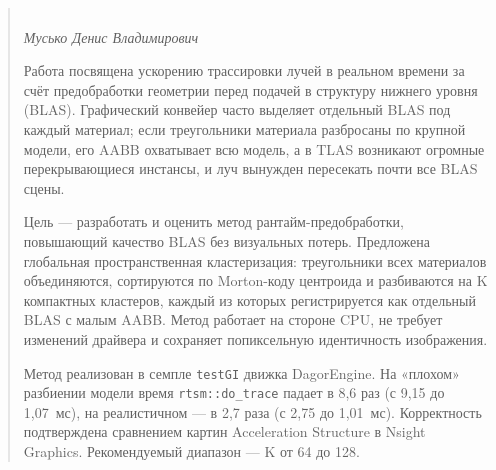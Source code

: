 \begin{abstract}

    \begin{center}
        \large{} \\
    \large\textit{Мусько Денис Владимирович} \\[1 cm]
    \end{center}

    Работа посвящена ускорению трассировки лучей в реальном времени за счёт
    предобработки геометрии перед подачей в структуру нижнего уровня (BLAS).
    Графический конвейер часто выделяет отдельный BLAS под каждый материал;
    если треугольники материала разбросаны по крупной модели, его AABB
    охватывает всю модель, а в TLAS возникают огромные перекрывающиеся
    инстансы, и луч вынужден пересекать почти все BLAS сцены.

    Цель --- разработать и оценить метод рантайм-предобработки, повышающий
    качество BLAS без визуальных потерь. Предложена глобальная
    пространственная кластеризация: треугольники всех материалов объединяются,
    сортируются по Morton-коду центроида и разбиваются на K компактных
    кластеров, каждый из которых регистрируется как отдельный BLAS с малым
    AABB. Метод работает на стороне CPU, не требует изменений драйвера и
    сохраняет попиксельную идентичность изображения.

    Метод реализован в семпле \texttt{testGI} движка DagorEngine. На «плохом»
    разбиении модели время \texttt{rtsm::do\_trace} падает в 8,6 раз
    (с 9,15 до 1,07~мс), на реалистичном --- в 2,7 раза
    (с 2,75 до 1,01~мс). Корректность подтверждена сравнением картин
    Acceleration Structure в Nsight Graphics. Рекомендуемый диапазон ---
    K от 64 до 128.


\end{abstract}
